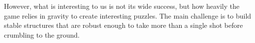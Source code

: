 However, what is interesting to us is not its wide success, but how heavily the game relies in gravity to create interesting puzzles. The main challenge is to build stable structures that are robust enough to take more than a single shot before crumbling to the ground.


